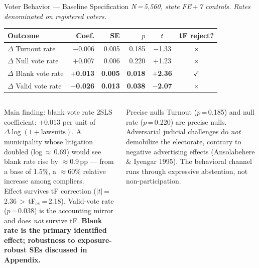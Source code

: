 \documentclass[aspectratio=169,10pt]{beamer}
\newcommand{\tick}{{\color{mygreen}$\checkmark$}}
\newcommand{\cross}{{\color{myred}$\times$}}
\begin{document}
\begin{frame}{Voter Behavior --- Baseline Specification}
\footnotesize
\textit{N\,=\,5,560, state FE\,$+$\,7 controls. Rates denominated on registered voters.}
\smallskip
\renewcommand{\arraystretch}{1.2}
\begin{tabular}{L{4.0cm}rrrcc}
  \toprule
  Outcome & Coef. & SE & $p$ & $t$ & tF reject? \\
  \midrule
  $\Delta$ Turnout rate      & $-$0.006 & 0.005 & 0.185 & $-$1.33 & \cross \\
  $\Delta$ Null vote rate    & $+$0.007 & 0.006 & 0.220 & $+$1.23 & \cross \\
  $\Delta$ Blank vote rate   & $+$\textbf{0.013} & \textbf{0.005} & \textbf{0.018} & $+$\textbf{2.36} & \tick \\
  $\Delta$ Valid vote rate   & $-$\textbf{0.026} & \textbf{0.013} & \textbf{0.038} & $-$\textbf{2.07} & \cross \\
  \bottomrule
\end{tabular}
\normalsize
\medskip
\begin{columns}[T]
\begin{column}{0.55\textwidth}
\begin{alertblock}{Main finding: blank vote rate}
  \footnotesize
  2SLS coefficient: $+0.013$ per unit of $\Delta\log(1+\text{lawsuits})$. A municipality whose litigation doubled (log\,$\approx$\,0.69) would see blank rate rise by $\approx$0.9\,pp --- from a base of 1.5\%, a $\approx$60\% relative increase among compliers.\\[4pt]
  Effect survives tF correction ($|t|$\,=\,2.36\,$>$\,tF$_\text{cv}$\,=\,2.18). Valid-vote rate ($p$\,=\,0.038) is the accounting mirror and does \emph{not} survive tF. \textbf{Blank rate is the primary identified effect; robustness to exposure-robust SEs discussed in Appendix.}
\end{alertblock}
\end{column}
\begin{column}{0.43\textwidth}
\begin{block}{Precise nulls}
  \footnotesize
  Turnout ($p$\,=\,0.185) and null rate ($p$\,=\,0.220) are precise nulls. Adversarial judicial challenges do \emph{not} demobilize the electorate, contrary to negative advertising effects (Ansolabehere \& Iyengar 1995). The behavioral channel runs through expressive abstention, not non-participation.
\end{block}
\end{column}
\end{columns}
\end{frame}
\end{document}
